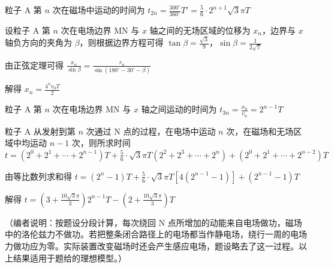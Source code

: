 \documentclass[\gkver]{gaokaozhenti}
\begin{document}
\begin{enumerate}
{粒子 A 第 $n$ 次在磁场中运动的时间为
$t_{2n}=\frac{300^\circ}{360^\circ}T'=\frac{5}{6}\cdot2^{n+1}\sqrt{3}\pi T$

设粒子 A 第 $n$ 次在电场边界 MN 与 $x$ 轴之间的无场区域的位移为 $x_{n}$，边界与 $x$ 轴负方向的夹角为 $\beta$，则根据边界方程可得
$\tan\beta=\frac{\sqrt{3}}{9}$，$\sin\beta=\frac{1}{2\sqrt{7}}$

由正弦定理可得
$\frac{x_{n}}{\sin\beta}=\frac{r_{n}}{\sin(180^\circ-30^\circ-\beta)}$

解得
$x_{n}=\frac{4^{n}v_{0}T}{2}$

粒子 A 第 $n$ 次在电场边界 MN 与 $x$ 轴之间运动的时间为
$t_{3n}=\frac{x_{n}}{v_{n}}=2^{n-1}T$

粒子 A 从发射到第 $n$ 次通过 N 点的过程，在电场中运动 $n$ 次，在磁场和无场区域中均运动 $n-1$ 次，则所求时间
$t=(2^{0}+2^{1}+\cdots+2^{n-1})T+\frac{5}{6}\cdot\sqrt{3}\pi T(2^{2}+2^{3}+\cdots+2^{n})+(2^{0}+2^{1}+\cdots+2^{n-2})T$

由等比数列求和得
$t=(2^{n}-1)T+\frac{5}{6}\cdot\sqrt{3}\pi T[4(2^{n-1}-1)]+(2^{n-1}-1)T$

解得
$t=(3+\frac{10\sqrt{3}\pi}{3})2^{n-1}T-(2+\frac{10\sqrt{3}\pi}{3})T$

（编者说明：按题设分段计算，每次绕回 N 点所增加的动能来自电场做功，磁场中的洛伦兹力不做功。若把整条闭合路径上的电场都当作静电场，绕行一周的电场力做功应为零。实际装置改变磁场时还会产生感应电场，题设略去了这一过程。以上结果适用于题给的理想模型。）
}

\end{enumerate}
\end{document}
